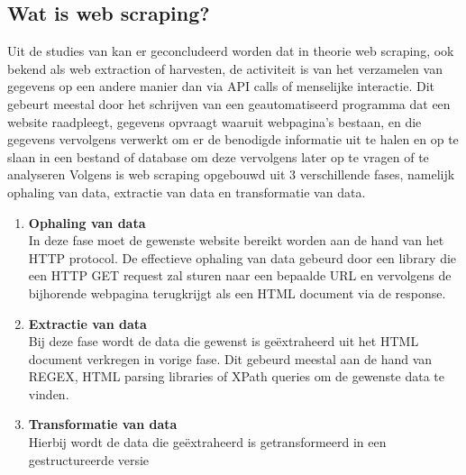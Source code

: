\subsection{Wat is web scraping?}
Uit de studies van \cite{Mitchell2018,Zhao2017} kan er geconcludeerd worden dat in theorie web scraping, ook bekend als web extraction of
harvesten, de activiteit is van het verzamelen van gegevens op een andere manier dan via API calls of menselijke interactie. Dit gebeurt meestal door het schrijven van een geautomatiseerd programma dat een website raadpleegt, gegevens opvraagt waaruit webpagina's bestaan, en die gegevens vervolgens verwerkt om er de benodigde informatie uit te halen en op te slaan in een bestand of database om deze vervolgens later op te vragen of te analyseren  
\newline
Volgens \cite{Persson2019} is web scraping opgebouwd uit 3 verschillende fases, namelijk ophaling van data, extractie van data en transformatie van data.

\begin{enumerate}
    \item \textbf{Ophaling van data}
\\
In deze fase moet de gewenste website bereikt worden aan de hand van het HTTP protocol. De effectieve ophaling van data gebeurd  door een library die een HTTP GET request zal sturen naar een bepaalde URL en vervolgens de bijhorende webpagina terugkrijgt als een HTML document via de response.
    \item \textbf{Extractie van data}
\\
Bij deze fase wordt de data die gewenst is geëxtraheerd uit het HTML document verkregen in vorige fase. Dit gebeurd meestal aan de hand van REGEX, HTML parsing libraries of XPath queries om de gewenste data te vinden.
    \item \textbf{Transformatie van data}
\\
Hierbij wordt de data die geëxtraheerd is getransformeerd in een gestructureerde versie
\end{enumerate}

